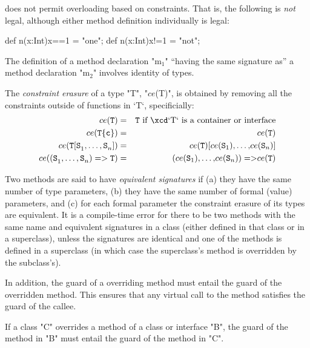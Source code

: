 \XtenCurrVer{} does not permit overloading based on constraints. That is, the
following is {\em not} legal, although either method definition individually
is legal:
\begin{xten}
   def n(x:Int){x==1} = "one";
   def n(x:Int){x!=1} = "not";
\end{xten}




The definition of a method declaration \xcdmath"m$_1$" ``having the same signature
as'' a method declaration \xcdmath"m$_2$" involves identity of types. 



The {\em constraint erasure} of a type \xcdmath"T", 
\xcdmath"$ce$(T)",
is obtained by removing all the constraints outside of functions in \xcd`T`,
specificially: 
\begin{eqnarray}
ce({\tt T}) &=& {\tt T} \mbox{ if \xcd`T` is a container or interface}\\
ce({\tt T\{c\}}) &=& ce({\tt T})\\
ce({\tt T[S}_1{\tt,}\ldots{\tt,S}_n{\tt ]})
  &=&
ce({\tt T}){\tt [} ce({\tt S}_1){\tt,}\ldots{\tt,} ce({\tt S}_n){\tt ]}\\
ce({\tt (S}_1{\tt,}\ldots{\tt,S}_n{\tt ) => T})
  &=&
{\tt }{\tt (} ce({\tt S}_1){\tt,}\ldots{\tt,} ce({\tt S}_n){\tt ) => } 
ce({\tt T})
\end{eqnarray}



 Two methods are said to have {\em equivalent signatures} if (a) they have the
 same number of type parameters, 
(b) they have the same number of formal (value) parameters, and (c)
for each formal parameter the constraint erasure of its types are equivalent.
It is a 
compile-time error for there to be two methods with the same name and
equivalent signatures in a class (either defined in that class or in a
superclass), unless the signatures are identical and one of the methods is
defined in a superclass (in which case the superclass's method is overridden
by the subclass's).

 



In addition, the guard of a overriding method
must entail
the guard of the overridden method.   This
ensures that any virtual call to the method
satisfies the guard of the callee.


  If a class \xcd"C" overrides a method of a class or interface
  \xcd"B", the guard of the method in \xcd"B" must entail
  the guard of the method in \xcd"C".


